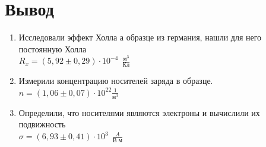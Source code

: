 \documentclass[11pt,a4paper]{article}
\begin{document}
\part*{Вывод}
\begin{enumerate}
	\item Исследовали эффект Холла а образце из германия, нашли для него постоянную Холла \\
	$\boxed{R_x = (5,92 \pm 0,29) \cdot 10^{-4} \ \  \frac{\text{м}^3}{\text{Кл}}}$
	\item Измерили концентрацию носителей заряда в образце.\\
	$\boxed{n = (1,06 \pm 0,07) \cdot 10^{22} \frac{1}{\text{м}^{3}}}$
	\item Определили, что носителями являются электроны и вычислили их подвижность\\
	$\boxed{\sigma = (6,93 \pm 0,41) \cdot 10^3 \ \ \frac{A}{\text{В м}}}$
\end{enumerate}
\end{document}
